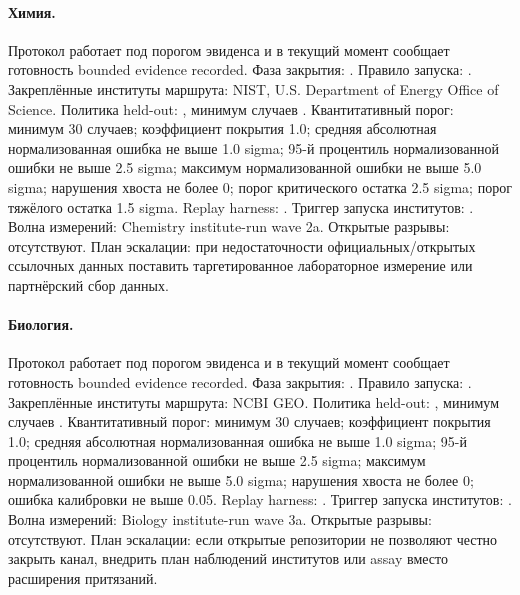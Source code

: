 \paragraph{Химия.}
Протокол  работает под порогом эвиденса  и в текущий момент сообщает готовность bounded evidence recorded.
Фаза закрытия: . Правило запуска: .
Закреплённые институты маршрута: NIST, \allowbreak U.S. Department of Energy Office of Science.
Политика held-out: , минимум случаев .
Квантитативный порог: минимум 30 случаев; коэффициент покрытия 1.0; средняя абсолютная нормализованная ошибка не выше 1.0 sigma; 95-й процентиль нормализованной ошибки не выше 2.5 sigma; максимум нормализованной ошибки не выше 5.0 sigma; нарушения хвоста не более 0; порог критического остатка 2.5 sigma; порог тяжёлого остатка 1.5 sigma.
Replay harness: .
Триггер запуска институтов: . Волна измерений: Chemistry institute-run wave 2a.
Открытые разрывы: отсутствуют.
План эскалации: при недостаточности официальных/открытых ссылочных данных поставить таргетированное лабораторное измерение или партнёрский сбор данных.

\paragraph{Биология.}
Протокол  работает под порогом эвиденса  и в текущий момент сообщает готовность bounded evidence recorded.
Фаза закрытия: . Правило запуска: .
Закреплённые институты маршрута: NCBI GEO.
Политика held-out: , минимум случаев .
Квантитативный порог: минимум 30 случаев; коэффициент покрытия 1.0; средняя абсолютная нормализованная ошибка не выше 1.0 sigma; 95-й процентиль нормализованной ошибки не выше 2.5 sigma; максимум нормализованной ошибки не выше 5.0 sigma; нарушения хвоста не более 0; ошибка калибровки не выше 0.05.
Replay harness: .
Триггер запуска институтов: . Волна измерений: Biology institute-run wave 3a.
Открытые разрывы: отсутствуют.
План эскалации: если открытые репозитории не позволяют честно закрыть канал, внедрить план наблюдений институтов или assay вместо расширения притязаний.

